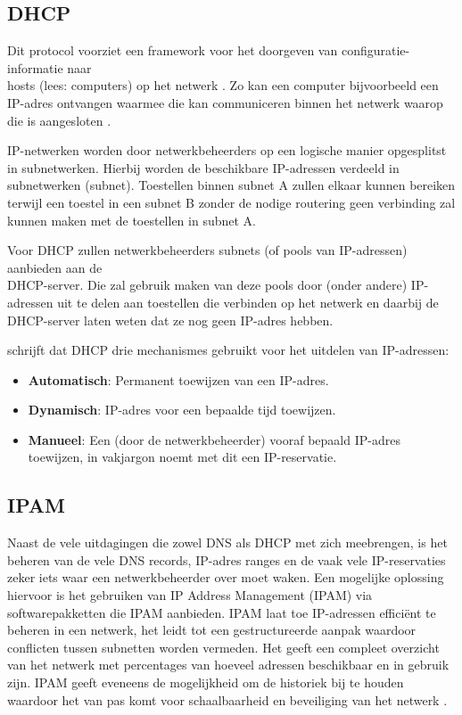 \documentclass{hogent-article}
\begin{document}
\subsection{DHCP}
Dit protocol voorziet een framework voor het doorgeven van configuratie-informatie naar \\hosts (lees: computers) op het netwerk . Zo kan een computer bijvoorbeeld een IP-adres ontvangen waarmee die kan communiceren binnen het netwerk waarop die is aangesloten \autocite{Droms1997}.

IP-netwerken worden door netwerkbeheerders op een logische manier opgesplitst in subnetwerken. Hierbij worden de beschikbare IP-adressen verdeeld in subnetwerken (subnet). Toestellen binnen subnet A zullen elkaar kunnen bereiken terwijl een toestel in een subnet B zonder de nodige routering geen verbinding zal kunnen maken met de toestellen in subnet A.

Voor DHCP zullen netwerkbeheerders subnets (of pools van IP-adressen) aanbieden aan de \\DHCP-server. Die zal gebruik maken van deze pools door (onder andere) IP-adressen uit te delen aan toestellen die verbinden op het netwerk en daarbij de DHCP-server laten weten dat ze nog geen IP-adres hebben.

\textcite{Droms1997} schrijft dat DHCP drie mechanismes gebruikt voor het uitdelen van IP-adressen:
\begin{itemize}
    \item \textbf{Automatisch}: Permanent toewijzen van een IP-adres.
    \item \textbf{Dynamisch}: IP-adres voor een bepaalde tijd toewijzen.
    \item \textbf{Manueel}: Een (door de netwerkbeheerder) vooraf bepaald IP-adres toewijzen, in vakjargon noemt met dit een IP-reservatie.
\end{itemize}

\subsection{IPAM}
Naast de vele uitdagingen die zowel DNS als DHCP met zich meebrengen, is het beheren van de vele DNS records, IP-adres ranges en de vaak vele IP-reservaties zeker iets waar een netwerkbeheerder over moet waken. 
Een mogelijke oplossing hiervoor is het gebruiken van IP Address Management (IPAM) via softwarepakketten die IPAM aanbieden.
IPAM laat toe IP-adressen efficiënt te beheren in een netwerk, het leidt tot een gestructureerde aanpak waardoor conflicten tussen subnetten worden vermeden. Het geeft een compleet overzicht van het netwerk met percentages van hoeveel adressen beschikbaar en in gebruik zijn. IPAM geeft eveneens de mogelijkheid om de historiek bij te houden waardoor het van pas komt voor schaalbaarheid en beveiliging van het netwerk \autocite{Rooney2020}.
\end{document}
